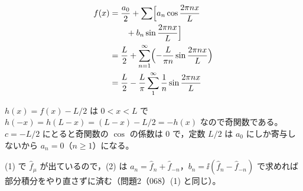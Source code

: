\begin{align*}
  f(x)&=\frac{a_0}{2}+\sum\Bigl[a_n\cos\frac{2\pi nx}{L}\\
  &\qquad+b_n\sin\frac{2\pi nx}{L}\Bigr]\\
  &=\frac{L}{2}+\sum_{n=1}^{\infty}\Bigl(-\frac{L}{\pi n}\sin\frac{2\pi nx}{L}\Bigr)\\
  &=\frac{L}{2}-\frac{L}{\pi}\sum_{1}^{\infty}\frac{1}{n}\sin\frac{2\pi nx}{L}
\end{align*}
\mikai
\item $h(x)=f(x)-L/2$ は $0<x<L$ で $h(-x)=h(L-x)=(L-x)-L/2=-h(x)$ なので奇関数である。$c=-L/2$ にとると奇関数の $\cos$ の係数は 0 で，定数 $L/2$ は $a_0$ にしか寄与しないから $a_n=0$（$n\ge1$）になる。
\item (1) で $\hat{f}_{\mu}$ が出ているので，(2) は $a_n=\hat{f}_n+\hat{f}_{-n}$，$b_n=\ii(\hat{f}_n-\hat{f}_{-n})$ で求めれば部分積分をやり直さずに済む（問題2（068）(1) と同じ）。
